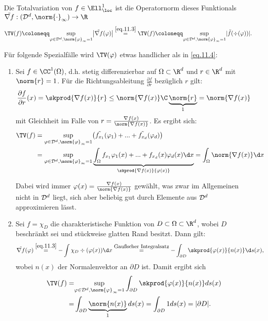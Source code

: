 Die Totalvariation von $f \in \Ell^1_{\loc}$ ist die Operatornorm dieses Funktionals $\tilde{\nabla f}:(\D^d,\norm{\cdot}_\infty) \to \R$
\begin{equation}\label{eq.11.4}
    \TV(f) \coloneqq \underset{\varphi \in \D^d, \norm{\varphi}_\infty = 1}{\sup} \bigl| \tilde{\nabla f}(\varphi)\bigr| 
    \overset{\eqref{eq.11.3}}{=} \TV(f) \coloneqq \underset{\varphi \in \D^d, \norm{\varphi}_\infty = 1}{\sup} \lvert \tilde{f}(\div(\varphi)) \rvert.
\end{equation}

Für folgende Spezialfälle wird  $\TV(\varphi)$ etwas handlicher als in \eqref{eq.11.4}:
\begin{enumerate}
    \item Sei $f \in \CC^1(\Omega)$, d.h. stetig differenzierbar auf $\Omega \subset \R^d$ und $r \in \R^d$ mit $\norm{r}=1$. 
        Für die Richtungsableitung $\frac{\partial f}{\partial r}$ bezüglich $r$ gilt:
        \[\frac{\partial f}{\partial r}(x)
        = \skprod{\nabla f(x)}{r} \leq \norm{\nabla f(x)} \C \underbrace{\norm{r}}_{1} 
        = \norm{\nabla f(x)}\]
    mit Gleichheit im Falle von $r = \frac{\nabla f(x)}{\norm{\nabla f(x)}}$.
    Es ergibt sich:
    \begin{align}\label{eq.11.5}
        \TV(f) &= \underset{\varphi \in \D^d, \norm{\varphi}_\infty = 1}{\sup} \bigl(\tilde{f_{x_1}}(\varphi_1) + ... + \tilde{f_{x_d}}(\varphi_d)\bigr) \nonumber \\
        &= \underset{\varphi \in \D^d, \norm{\varphi}_\infty = 1}{\sup} \underbrace{\int_\Omega f_{x_1}\varphi_1(x) + ... + f_{x_d}(x)\varphi_d(x) \d x}_{\skprod{\nabla f(x)}{\varphi(x)}} = \int_\Omega \norm{\nabla f(x)} \d x
    \end{align}

    Dabei wird immer $\varphi(x) = \frac{\nabla f(x)}{\norm{\nabla f(x)}}$ gewählt, was zwar im Allgemeinen nicht in $\mathcal{D}^d$ liegt, sich aber beliebig gut durch Elemente aus $\mathcal{D}^d$ approximieren lässt.

    \item Sei $f= \chi_D$ die charakteristische Funktion von $D \subset \Omega \subset \R^d$, wobei $D$ beschränkt sei und stückweise glatten Rand besitzt.
    Dann gilt:
    \[
        \tilde{\nabla f}(\varphi) \overset{\eqref{eq.11.3}}{=} - \int \chi_D \div(\varphi(x)) \d x \overset{\text{\small{Gaußscher Integralsatz}}}{=} -\int_{\partial D} \skprod{\varphi(x)}{n(x)} \d s(x),
    \]
    wobei $n(x)$ der Normalenvektor an $\partial D$ ist.
        Damit ergibt sich
    \begin{align}
        \TV(f) =& \underset{\varphi \in \D^d, \norm{\varphi}_\infty = 1}{\sup} \int_{\partial D} \skprod{\varphi(x)}{n(x)} ds(x) \nonumber \\
        =& \int_{\partial D}\underbrace{\norm{n(x)}}_{1} ds(x) = \int_{\partial D} 1 ds(x) = \lvert \partial D \rvert.
    \end{align}
\end{enumerate}

